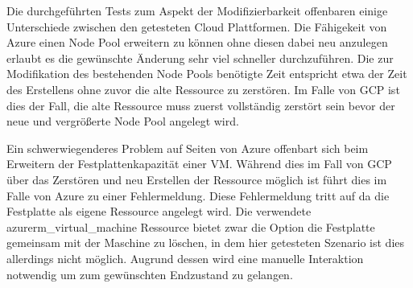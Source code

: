 \begin{spacing}{1.2}
Die durchgeführten Tests zum Aspekt der Modifizierbarkeit offenbaren
einige Unterschiede zwischen den getesteten Cloud Plattformen.
Die Fähigekeit von Azure einen Node Pool erweitern zu können ohne
diesen dabei neu anzulegen erlaubt es die gewünschte Änderung sehr
viel schneller durchzuführen. Die zur Modifikation des bestehenden
Node Pools benötigte Zeit entspricht etwa der Zeit des Erstellens
ohne zuvor die alte Ressource zu zerstören. Im Falle von GCP ist
dies der Fall, die alte Ressource muss zuerst vollständig zerstört
sein bevor der neue und vergrößerte Node Pool angelegt wird.

Ein schwerwiegenderes Problem auf Seiten von Azure offenbart sich
beim Erweitern der Festplattenkapazität einer VM. Während dies im Fall
von GCP über das Zerstören und neu Erstellen der Ressource möglich
ist führt dies im Falle von Azure zu einer Fehlermeldung.
Diese Fehlermeldung tritt auf da die Festplatte als eigene
Ressource angelegt wird. Die verwendete azurerm\_virtual\_machine
Ressource bietet zwar die Option die Festplatte gemeinsam mit der
Maschine zu löschen, in dem hier getesteten Szenario ist dies
allerdings nicht möglich. Augrund dessen wird eine manuelle
Interaktion notwendig um zum gewünschten Endzustand zu gelangen.

\end{spacing}